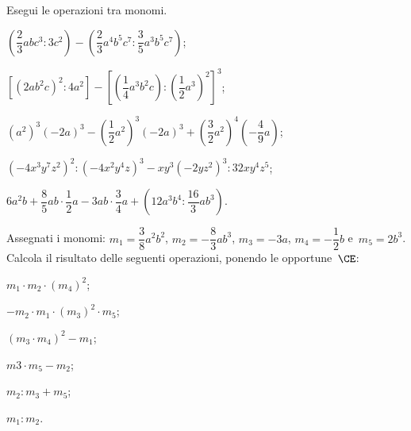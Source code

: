 \begin{esercizio}[\Ast]
 \label{ese:10.37} %
Esegui le operazioni tra monomi.

\begin{enumeratea}
 \item $\left(\dfrac{2}{3}abc^3:3c^2\right)-\left(\dfrac{2}{3}a^4b^5c^7:\dfrac{3}{5}a^3b^5c^7\right)$;
 \item $\left[\left(2ab^2c\right)^2:4a^2\right]-\left[\left(\dfrac{1}{4}a^3b^2c\right):\left(\dfrac{1}{2}a^3\right)^2\right]^3$;  \item $\left(a^2\right)^3(-2a)^3-\left(\dfrac{1}{2}a^2\right)^3(-2a)^3+\left(\dfrac{3}{2}a^2\right)^4\left(-\dfrac{4}{9}a\right)$;
 \item $\left(-4x^3y^7z^2\right)^2:\left(-4x^2y^4z\right)^3-xy^3\left(-2yz^2\right)^3:32xy^4z^5$;
 \item $6a^2b+\dfrac{8}{5}ab\cdot\dfrac{1}{2}a-3ab\cdot\dfrac{3}{4}a+\left(12a^3b^4:\dfrac{16}{3}ab^3\right)$.
\end{enumeratea}
\end{esercizio}

\begin{esercizio}
 \label{ese:10.38} %
Assegnati i monomi:
$m_{{1}}=\dfrac{3}{8}a^{2}b^{2}$, $m_{2}=-{\dfrac{8}{3}}ab^{3}$, $m_{3}=-3a$, $m_{{4}}=-{\dfrac{1}{2}}b$ e~$m_{{5}}=2b^{3}$.
Calcola il risultato delle seguenti operazioni, ponendo le opportune~$\CE$:
\begin{multicols}{3}
\begin{enumeratea}
 \item $m_{{1}}\cdot m_{2}\cdot (m_{{4}})^{2}$;
 \item $-m_{2}\cdot m_{{1}}\cdot (m_{3})^{2}\cdot m_{{5}}$;
 \item $(m_{3}\cdot m_{{4}})^{2}-m_{{1}}$;
 \item $m3\cdot m_{{5}}-m_{2}$;
 \item $m_{2}:m_{3}+m_{{5}}$;
 \item $m_{{1}}:m_{2}$.
\end{enumeratea}
\end{multicols}
\end{esercizio}

